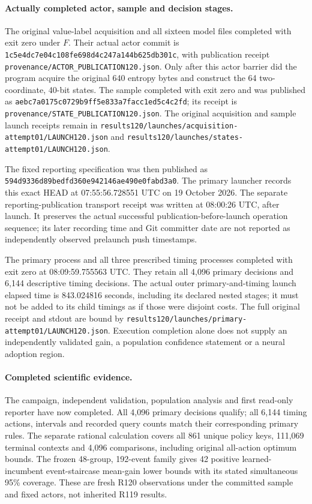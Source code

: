 \paragraph{Actually completed actor, sample and decision stages.}
The original value-label acquisition and all sixteen model files completed
with exit zero under $F$. Their actual actor commit is
\nolinkurl{1c5e4dc7e04c108fe698d4c247a144b625db301c},
with publication receipt
\nolinkurl{provenance/ACTOR_PUBLICATION120.json}.
Only after this actor barrier did the program acquire the original
640 entropy bytes and construct the 64 two-coordinate, 40-bit states.
The sample completed with exit zero and was published as
\nolinkurl{aebc7a0175c0729b9ff5e833a7facc1ed5c4c2fd}; its receipt is
\nolinkurl{provenance/STATE_PUBLICATION120.json}.
The original acquisition and sample launch receipts remain in
\nolinkurl{results120/launches/acquisition-attempt01/LAUNCH120.json} and
\nolinkurl{results120/launches/states-attempt01/LAUNCH120.json}.

The fixed reporting specification was then published as
\nolinkurl{594d9336d89bedfd360e942146ae490e0fabd3a0}.
The primary launcher records this exact HEAD at 07:55:56.728551 UTC
on 19 October 2026. The separate reporting-publication transport receipt
was written at 08:00:26 UTC, after launch. It preserves the actual
successful publication-before-launch operation sequence; its later
recording time and Git committer date are not reported as independently
observed prelaunch push timestamps.

The primary process and all three prescribed timing processes completed
with exit zero at 08:09:59.755563 UTC. They retain all 4,096 primary
decisions and 6,144 descriptive timing decisions. The actual outer
primary-and-timing launch elapsed time is 843.024816 seconds, including
its declared nested stages; it must not be added to its child timings
as if those were disjoint costs. The full original receipt and stdout
are bound by
\nolinkurl{results120/launches/primary-attempt01/LAUNCH120.json}.
Execution completion alone does not supply an independently validated
gain, a population confidence statement or a neural adoption region.

\paragraph{Completed scientific evidence.}
The campaign, independent validation, population analysis and first
read-only reporter have now completed. All 4,096 primary decisions qualify;
all 6,144 timing actions, intervals and recorded query counts match their
corresponding primary rules. The separate rational calculation covers all
861 unique policy keys, 111,069 terminal contexts and 4,096 comparisons,
including original all-action optimum bounds. The frozen 48-group,
192-event family gives 42 positive learned-incumbent event-staircase
mean-gain lower bounds with its stated simultaneous 95\% coverage.
These are fresh R120 observations under the committed sample and fixed
actors, not inherited R119 results.

